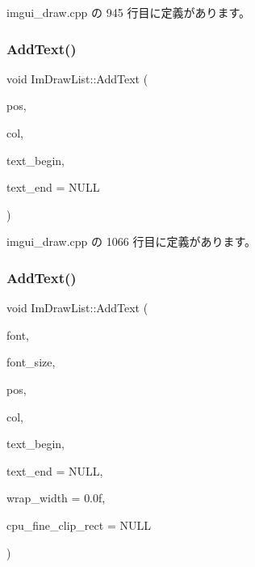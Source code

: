  imgui\+\_\+draw.\+cpp の 945 行目に定義があります。

\mbox{\label{struct_im_draw_list_ac5221bd86b3429f6d5b6e6ffe454942d}} 
\subsubsection{\texorpdfstring{Add\+Text()}{AddText()}\hspace{0.1cm}{\footnotesize\ttfamily [1/2]}}
{\footnotesize\ttfamily void Im\+Draw\+List\+::\+Add\+Text (\begin{DoxyParamCaption}\item[{const \mbox{\hyperlink{struct_im_vec2}{Im\+Vec2}} \&}]{pos,  }\item[{\mbox{\hyperlink{imgui_8h_a118cff4eeb8d00e7d07ce3d6460eed36}{Im\+U32}}}]{col,  }\item[{const char $\ast$}]{text\+\_\+begin,  }\item[{const char $\ast$}]{text\+\_\+end = {\ttfamily NULL} }\end{DoxyParamCaption})}



 imgui\+\_\+draw.\+cpp の 1066 行目に定義があります。

\mbox{\label{struct_im_draw_list_a0a226cbe9bb1480428e145d8535cda26}} 
\subsubsection{\texorpdfstring{Add\+Text()}{AddText()}\hspace{0.1cm}{\footnotesize\ttfamily [2/2]}}
{\footnotesize\ttfamily void Im\+Draw\+List\+::\+Add\+Text (\begin{DoxyParamCaption}\item[{const \mbox{\hyperlink{struct_im_font}{Im\+Font}} $\ast$}]{font,  }\item[{float}]{font\+\_\+size,  }\item[{const \mbox{\hyperlink{struct_im_vec2}{Im\+Vec2}} \&}]{pos,  }\item[{\mbox{\hyperlink{imgui_8h_a118cff4eeb8d00e7d07ce3d6460eed36}{Im\+U32}}}]{col,  }\item[{const char $\ast$}]{text\+\_\+begin,  }\item[{const char $\ast$}]{text\+\_\+end = {\ttfamily NULL},  }\item[{float}]{wrap\+\_\+width = {\ttfamily 0.0f},  }\item[{const \mbox{\hyperlink{struct_im_vec4}{Im\+Vec4}} $\ast$}]{cpu\+\_\+fine\+\_\+clip\+\_\+rect = {\ttfamily NULL} }\end{DoxyParamCaption})}



